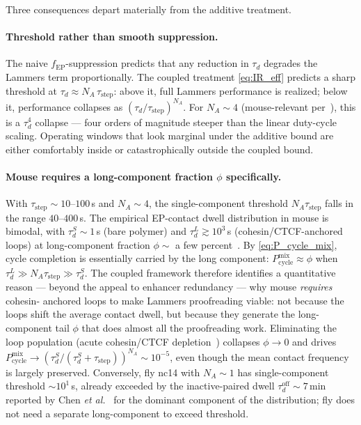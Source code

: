 \documentclass[11pt]{article}
\newcommand{\EP}{\mathrm{EP}}
\begin{document}
Three consequences depart materially from the additive treatment.

\paragraph{Threshold rather than smooth suppression.} The naive
$f_{\EP}$-suppression predicts that any reduction in $\tau_d$ degrades the
Lammers term proportionally. The coupled treatment \eqref{eq:IR_eff}
predicts a sharp threshold at $\tau_d \approx N_A\,\tau_{\mathrm{step}}$:
above it, full Lammers performance is realized; below it, performance
collapses as $(\tau_d/\tau_{\mathrm{step}})^{N_A}$. For $N_A\!\sim\!4$
(mouse-relevant per~\cite{Lammers2023}), this is a $\tau_d^{4}$ collapse
--- four orders of magnitude steeper than the linear duty-cycle scaling.
Operating windows that look marginal under the additive bound are either
comfortably inside or catastrophically outside the coupled bound.

\paragraph{Mouse requires a long-component fraction $\phi$ specifically.}
With $\tau_{\mathrm{step}}\sim 10$--$100$\,s and $N_A\sim 4$, the
single-component threshold $N_A\tau_{\mathrm{step}}$ falls in the range
$40$--$400$\,s. The empirical EP-contact dwell distribution in mouse is
bimodal, with $\tau_d^{S}\sim 1$\,s (bare polymer) and $\tau_d^{L}\gtrsim
10^{3}$\,s (cohesin/CTCF-anchored loops) at long-component fraction
$\phi\sim$ a few percent~\cite{Gabriele2022,Mach2022}. By
\eqref{eq:P_cycle_mix}, cycle completion is essentially carried by the
long component: $P_{\mathrm{cycle}}^{\mathrm{mix}}\approx\phi$ when
$\tau_d^{L}\gg N_A\tau_{\mathrm{step}}\gg\tau_d^{S}$. The coupled
framework therefore identifies a quantitative reason --- beyond the
appeal to enhancer redundancy --- why mouse \emph{requires} cohesin-
anchored loops to make Lammers proofreading viable: not because the
loops shift the average contact dwell, but because they generate the
long-component tail $\phi$ that does almost all the proofreading work.
Eliminating the loop population (acute cohesin/CTCF
depletion~\cite{Saiz2026}) collapses $\phi\to 0$ and drives
$P_{\mathrm{cycle}}^{\mathrm{mix}}\to (\tau_d^{S}/(\tau_d^{S}+
\tau_{\mathrm{step}}))^{N_A}\sim 10^{-5}$, even though the mean contact
frequency~\cite{Hsieh2022} is largely preserved. Conversely, fly nc14
with $N_A\!\sim\!1$ has single-component threshold $\sim 10^{1}$\,s,
already exceeded by the inactive-paired dwell
$\tau_d^{\mathrm{off}}\sim 7$\,min reported by Chen
\textit{et al.}~\cite{Chen2018} for the dominant component of the
distribution; fly does not need a separate long-component to exceed
threshold.
\end{document}
